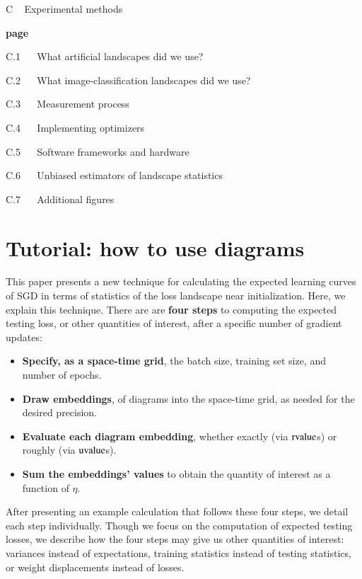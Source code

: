 \documentclass[anon,12pt]{colt2021} %
\newcommand{\uvalue}{\text{\textnormal{uvalue}}}
\newcommand{\rvalue}{\text{\textnormal{rvalue}}}
\begin{document}
        {\bf
        \par\noindent C ~ Experimental methods}                                 \hfill {\bf page \pageref{appendix:experiments}}
        \par\indent     C.1 ~~ What artificial landscapes did we use?           \hfill \pageref{appendix:artificial}  
        \par\indent     C.2 ~~ What image-classification landscapes did we use? \hfill \pageref{appendix:natural}
        \par\indent     C.3 ~~ Measurement process                              \hfill \pageref{appendix:measure}
        \par\indent     C.4 ~~ Implementing optimizers                          \hfill \pageref{appendix:optimizers}
        \par\indent     C.5 ~~ Software frameworks and hardware                 \hfill \pageref{appendix:frameworks}
        \par\indent     C.6 ~~ Unbiased estimators of landscape statistics      \hfill \pageref{appendix:bessel}
        \par\indent     C.7 ~~ Additional figures                               \hfill \pageref{appendix:figures}
 
\newpage
\section{Tutorial: how to use diagrams}                \label{appendix:tutorial}
    This paper presents a new technique for calculating the expected learning
    curves of SGD in terms of statistics of the loss landscape near
    initialization.  Here, we explain this technique.
    There are are {\bf four steps} to computing the expected testing loss, or
    other quantities of interest, after a specific number of gradient updates: 
    \begin{itemize}
        \item {\bf Specify, as a space-time grid}, the batch size, training set
            size, and number of epochs. 
        \item {\bf Draw embeddings}, of diagrams into the
            space-time grid, as needed for the desired precision.
        \item {\bf Evaluate each diagram embedding}, whether exactly
            (via $\rvalue$s)
            or roughly
            (via $\uvalue$s).
        \item {\bf Sum the embeddings' values} to obtain the quantity of
              interest as a function of $\eta$.
    \end{itemize}
    \noindent
    After presenting an example calculation that follows these four steps, we
    detail each step individually.  Though we focus on the computation of
    expected testing losses, we describe how the four steps may give us other
    quantities of interest: variances instead of expectations, training
    statistics instead of testing statistics, or weight displacements instead
    of losses.  
\end{document}
